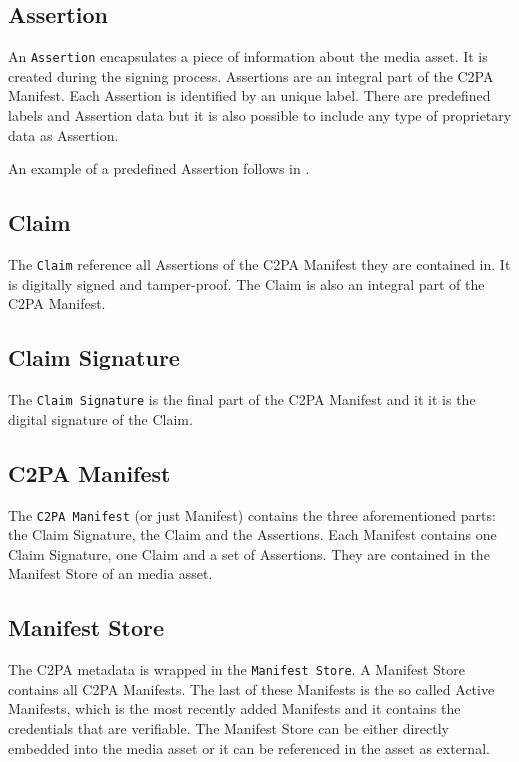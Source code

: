 \subsection{Assertion}

An \texttt{Assertion} encapsulates a piece of information about the media asset. It is created during the signing process. Assertions are an integral part of the C2PA Manifest. Each Assertion is identified by an unique label. There are predefined labels and Assertion data but it is also possible to include any type of proprietary data as Assertion. 

An example of a predefined Assertion follows in .

\subsection{Claim}

The \texttt{Claim} reference all Assertions of the C2PA Manifest they are contained in. It is digitally signed and tamper-proof. The Claim is also an integral part of the C2PA Manifest.

\subsection{Claim Signature}

The \texttt{Claim Signature} is the final part of the C2PA Manifest and it it is the digital signature of the Claim.

\subsection{C2PA Manifest}

The \texttt{C2PA Manifest} (or just Manifest) contains the three aforementioned parts: the Claim Signature, the Claim and the Assertions. Each Manifest contains one Claim Signature, one Claim and a set of Assertions. They are contained in the Manifest Store of an media asset.

\subsection{Manifest Store}

The C2PA metadata is wrapped in the \texttt{Manifest Store}. A Manifest Store contains all C2PA Manifests. The last of these Manifests is the so called Active Manifests, which is the most recently added Manifests and it contains the credentials that are verifiable. The Manifest Store can be either directly embedded into the media asset or it can be referenced in the asset as external.

